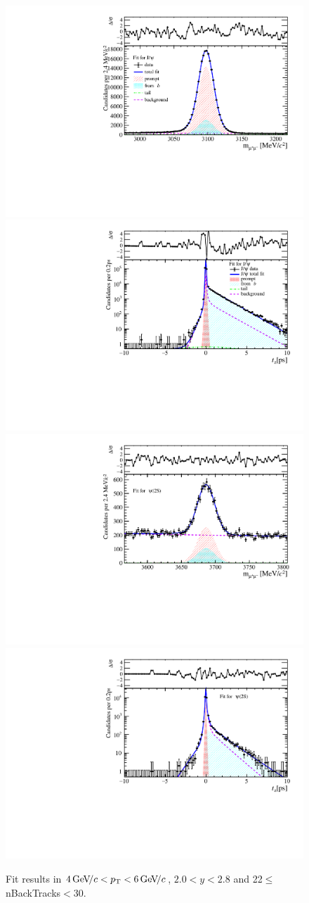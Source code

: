 \begin{figure}[H]
\begin{center}
\includegraphics[width=0.47\linewidth]{pdf/Jpsi/drawmassB/n4y1pt3.pdf}
\includegraphics[width=0.47\linewidth]{pdf/Jpsi/2DFitB/n4y1pt3.pdf}
\vspace*{-0.5cm}
\includegraphics[width=0.47\linewidth]{pdf/Psi2S/drawmassB/n4y1pt3.pdf}
\includegraphics[width=0.47\linewidth]{pdf/Psi2S/2DFitB/n4y1pt3.pdf}
\vspace*{-0.5cm}
\end{center}
\caption{Fit results in $4\text{\,Ge\kern -0.1em V\!/}c<p_{\mathrm{T}}<6\text{\,Ge\kern -0.1em V\!/}c$, $2.0<y<2.8$ and 22$\leq$nBackTracks$<$30.}
\label{Fitn4y1pt3}
\end{figure}
